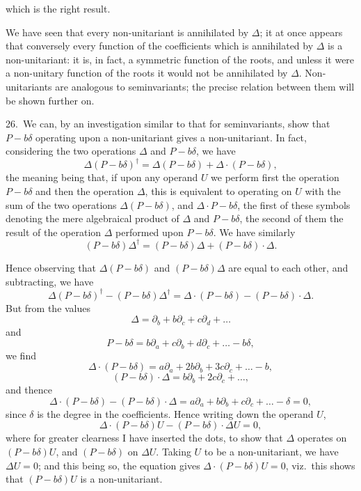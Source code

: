 \documentclass[11pt]{article}
\begin{document}
which is the right result.

We have seen that every non-unitariant is annihilated by $\Delta$; it at once appears that conversely every function of the coefficients which is annihilated by $\Delta$ is a non-unitariant: it is, in fact, a symmetric function of the roots, and unless it were a non-unitary function of the roots it would not be annihilated by $\Delta$. Non-unitariants are analogous to seminvariants; the precise relation between them will be shown further on.

26.\ We can, by an investigation similar to that for seminvariants, show that $P - b\delta$ operating upon a non-unitariant gives a non-unitariant. In fact, considering the two operations $\Delta$ and $P - b\delta$, we have
\[
\Delta(P - b\delta)^\dagger = \Delta(P - b\delta) + \Delta \cdot (P - b\delta),
\]
the meaning being that, if upon any operand $U$ we perform first the operation $P - b\delta$ and then the operation $\Delta$, this is equivalent to operating on $U$ with the sum of the two operations $\Delta(P - b\delta)$, and $\Delta \cdot P - b\delta$, the first of these symbols denoting the mere algebraical product of $\Delta$ and $P - b\delta$, the second of them the result of the operation $\Delta$ performed upon $P - b\delta$. We have similarly
\[
(P - b\delta)\Delta^\dagger = (P - b\delta)\Delta + (P - b\delta)\cdot\Delta.
\]

Hence observing that $\Delta(P - b\delta)$ and $(P - b\delta)\Delta$ are equal to each other, and subtracting, we have
\[
\Delta(P - b\delta)^\dagger - (P - b\delta)\Delta^\dagger = \Delta\cdot(P - b\delta) - (P - b\delta)\cdot\Delta.
\]
But from the values
\[
\Delta = \partial_b + b\partial_c + c\partial_d + \ldots
\]
and
\[
P - b\delta = b\partial_a + c\partial_b + d\partial_c + \ldots - b\delta,
\]
we find
\[
\Delta\cdot(P - b\delta) = a\partial_a + 2b\partial_b + 3c\partial_c + \ldots - b,
\]
\[
(P - b\delta)\cdot\Delta = b\partial_b + 2c\partial_c + \ldots,
\]
and thence
\[
\Delta\cdot(P - b\delta) - (P - b\delta)\cdot\Delta = a\partial_a + b\partial_b + c\partial_c + \ldots - \delta = 0,
\]
since $\delta$ is the degree in the coefficients. Hence writing down the operand $U$,
\[
\Delta\cdot(P - b\delta) U - (P - b\delta)\cdot\Delta U = 0,
\]
where for greater clearness I have inserted the dots, to show that $\Delta$ operates on $(P - b\delta) U$, and $(P - b\delta)$ on $\Delta U$. Taking $U$ to be a non-unitariant, we have $\Delta U = 0$; and this being so, the equation gives $\Delta\cdot(P - b\delta) U = 0$, viz.\ this shows that $(P - b\delta) U$ is a non-unitariant.
\end{document}

